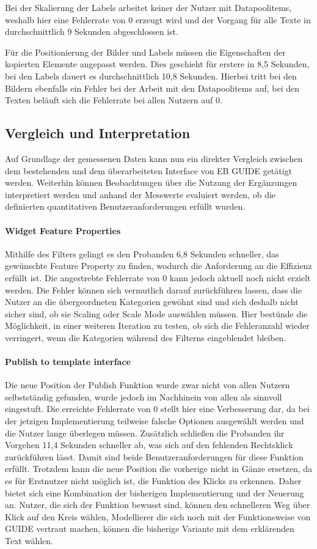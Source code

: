 Bei der Skalierung der Labels arbeitet keiner der Nutzer mit Datapoolitems, weshalb hier eine Fehlerrate von 0 erzeugt wird und der Vorgang für alle Texte in durchschnittlich 9 Sekunden abgeschlossen ist.

Für die Positionierung der Bilder und Labels müssen die Eigenschaften der kopierten Elemente angepasst werden.
Dies geschieht für erstere in 8,5 Sekunden, bei den Labels dauert es durchschnittlich 10,8 Sekunden.
Hierbei tritt bei den Bildern ebenfalls ein Fehler bei der Arbeit mit den Datapoolitems auf, bei den Texten beläuft sich die Fehlerrate bei allen Nutzern auf 0.

\subsection{Vergleich und Interpretation}Auf Grundlage der gemessenen Daten kann nun ein direkter Vergleich zwischen dem bestehenden und dem überarbeiteten Interface von EB GUIDE getätigt werden.
Weiterhin können Beobachtungen über die Nutzung der Ergänzungen interpretiert werden und anhand der Messwerte evaluiert werden, ob die definierten quantitativen Benutzeranforderungen erfüllt wurden.

\paragraph{Widget Feature Properties}
Mithilfe des Filters gelingt es den Probanden 6,8 Sekunden schneller, das gewünschte Feature Property zu finden, wodurch die Anforderung an die Effizienz erfüllt ist.
Die angestrebte Fehlerrate von 0 kann jedoch aktuell noch nicht erzielt werden.
Die Fehler können sich vermutlich darauf zurückführen lassen, dass die Nutzer an die übergeordneten Kategorien gewöhnt sind und sich deshalb nicht sicher sind, ob sie Scaling oder Scale Mode auswählen müssen.
Hier bestünde die Möglichkeit, in einer weiteren Iteration zu testen, ob sich die Fehleranzahl wieder verringert, wenn die Kategorien während des Filterns eingeblendet bleiben.

\paragraph{Publish to template interface}
Die neue Position der Publish Funktion wurde zwar nicht von allen Nutzern selbstständig gefunden, wurde jedoch im Nachhinein von allen als sinnvoll eingestuft.
Die erreichte Fehlerrate von 0 stellt hier eine Verbesserung dar, da bei der jetzigen Implementierung teilweise falsche Optionen ausgewählt werden und die Nutzer lange überlegen müssen.
Zusätzlich schließen die Probanden ihr Vorgehen 11,4 Sekunden schneller ab, was sich auf den fehlenden Rechtsklick zurückführen lässt.
Damit sind beide Benutzeranforderungen für diese Funktion erfüllt.
Trotzdem kann die neue Position die vorherige nicht in Gänze ersetzen, da es für Erstnutzer nicht möglich ist, die Funktion des Klicks zu erkennen.
Daher bietet sich eine Kombination der bisherigen Implementierung und der Neuerung an.
Nutzer, die sich der Funktion bewusst sind, können den schnelleren Weg über Klick auf den Kreis wählen, Modellierer die sich noch mit der Funktionsweise von GUIDE vertraut machen, können die bisherige Variante mit dem erklärenden Text wählen.

